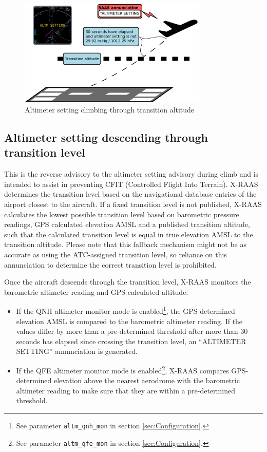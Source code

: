 \documentclass[a4paper,12pt]{article}
\newcommand{\confopt}[1]{\texttt{#1}}
\begin{document}
\begin{figure}[H]
\begin{center}
\includegraphics[width=0.8\textwidth]{../src/alt_setting_clb.pdf}
\end{center}
\caption{Altimeter setting climbing through transition altitude}
\end{figure}

\newpage
\subsection{Altimeter setting descending through transition level}
\label{subsec:AltmQNHQFEMon}

This is the reverse advisory to the altimeter setting advisory during
climb and is intended to assist in preventing CFIT (Controlled Flight
Into Terrain). X-RAAS determines the transition level based on the
navigational database entries of the airport closest to the aircraft. If
a fixed transition level is not published, X-RAAS calculates the lowest
possible transition level based on barometric pressure readings, GPS
calculated elevation AMSL and a published transition altitude, such that
the calculated transition level is equal in true elevation AMSL to the
transition altitude. Please note that this fallback mechanism might not
be as accurate as using the ATC-assigned transition level, so reliance on
this annunciation to determine the correct transition level is
prohibited.

Once the aircraft descends through the transition level, X-RAAS monitors
the barometric altimeter reading and GPS-calculated altitude:

\begin{itemize}

\item If the QNH altimeter monitor mode is enabled\footnote{See parameter
\confopt{altm\_qnh\_mon} in section \ref{sec:Configuration}.}, the
GPS-determined elevation AMSL is compared to the barometric altimeter
reading. If the values differ by more than a pre-determined threshold
after more than 30 seconds has elapsed since crossing the transition
level, an “ALTIMETER SETTING” annunciation is generated.

\item If the QFE altimeter monitor mode is enabled\footnote{See parameter
\confopt{altm\_qfe\_mon} in section \ref{sec:Configuration}.}, X-RAAS compares
GPS-determined elevation above the nearest aerodrome with the barometric
altimeter reading to make sure that they are within a pre-determined
threshold.

\end{itemize}
\end{document}
